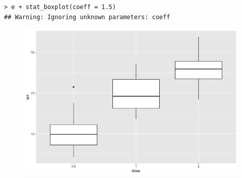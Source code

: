 \begin{lstlisting}[language=html]
> e + stat_boxplot(coeff = 1.5)
## Warning: Ignoring unknown parameters: coeff
\end{lstlisting}
\begin{figure}[H]\begin{center}\includegraphics[scale=1 ]{ilu/bg76.png}\end{center}\end{figure}

